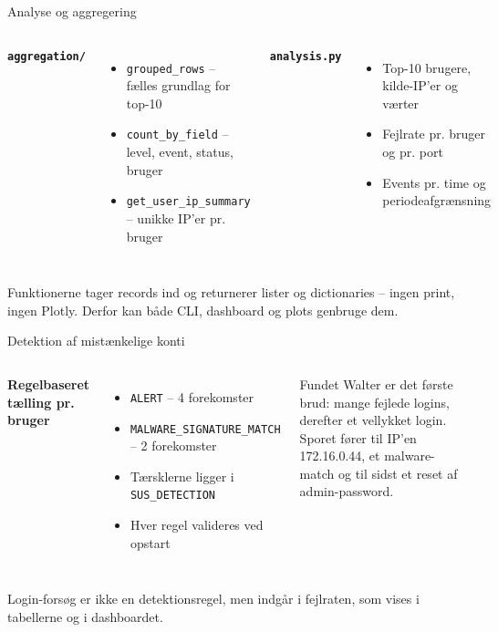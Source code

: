 \documentclass[aspectratio=169,10pt]{beamer}
\newcommand{\code}[1]{\texttt{\small #1}}
\begin{document}
\begin{frame}{Analyse og aggregering}
  \begin{columns}[T]
      \textbf{\code{aggregation/}}
      \vspace{0.3em}
      \begin{itemize}
        \item \code{grouped\_rows} -- fælles grundlag for top-10
        \item \code{count\_by\_field} -- level, event, status, bruger
        \item \code{get\_user\_ip\_summary} -- unikke IP'er pr. bruger
      \end{itemize}
      \textbf{\code{analysis.py}}
      \vspace{0.3em}
      \begin{itemize}
        \item Top-10 brugere, kilde-IP'er og værter
        \item Fejlrate pr. bruger og pr. port
        \item Events pr. time og periodeafgrænsning
      \end{itemize}
  \end{columns}
  \vfill
  {\footnotesize\color{muted}Funktionerne tager records ind og returnerer lister og dictionaries -- ingen print, ingen Plotly. Derfor kan både CLI, dashboard og plots genbruge dem.}
\end{frame}

\begin{frame}{Detektion af mistænkelige konti}
  \begin{columns}[T]
      \textbf{Regelbaseret tælling pr. bruger}
      \vspace{0.3em}
      \begin{itemize}
        \item \code{ALERT} -- 4 forekomster
        \item \code{MALWARE\_SIGNATURE\_MATCH} -- 2 forekomster
        \item Tærsklerne ligger i \code{SUS\_DETECTION}
        \item Hver regel valideres ved opstart
      \end{itemize}
      \begin{block}{Fundet}
        \small Walter er det første brud: mange fejlede logins, derefter et vellykket login. Sporet fører til IP'en 172.16.0.44, et malware-match og til sidst et reset af admin-password.
      \end{block}
  \end{columns}
  \vspace{0.4em}
  {\footnotesize\color{muted}Login-forsøg er ikke en detektionsregel, men indgår i fejlraten, som vises i tabellerne og i dashboardet.}
\end{frame}
\end{document}
